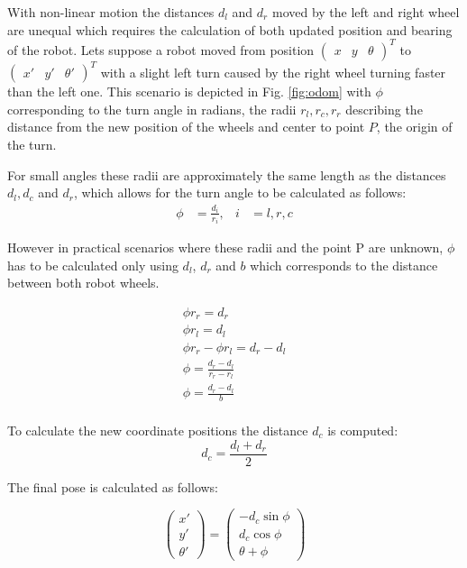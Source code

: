With non-linear motion the distances $d_{l}$ and $d_{r}$ moved by the left and right wheel are unequal which requires the calculation of both updated position and bearing of the robot. 
Lets suppose a robot moved from position $\begin{pmatrix} x & y & \theta \end{pmatrix}^{T}$ to $\begin{pmatrix} x' & y' & \theta' \end{pmatrix}^{T}$ with a slight left turn caused by the right wheel turning faster than the left one. 
This scenario is depicted in Fig. \ref{fig:odom} with $\phi$ corresponding to the turn angle in radians, the radii $r_{l}, r_{c}, r_{r}$ describing the distance from the new position of the wheels and center to point $P$, the origin of the turn. 

For small angles these radii are approximately the same length as the distances $d_{l}, d_{c}$ and $d_{r}$, which allows for the turn angle to be calculated as follows:
\begin{align*}
	\phi &= \frac{d_{i}}{r_{i}}, & i &= l, r, c  
\end{align*}

However in practical scenarios where these radii and the point P are unknown, $\phi$ has to be calculated only using $d_{l}$, $d_{r}$ and $b$ which corresponds to the distance between both robot wheels.

\begin{equation*}
	\begin{split}
		\phi r_{r} = d_{r} \\
		\phi r_{l} = d_{l} \\
		\phi r_{r} - \phi r_{l} = d_{r} - d_{l} \\
		\phi = \frac{d_{r} - d_{l}}{r_{r} - r_{l}} \\ 
		\phi = \frac{d_{r} - d_{l}}{b} \\
	\end{split}
\end{equation*}

To calculate the new coordinate positions the distance $d_{c}$ is computed:
\begin{equation*}
	d_{c} = \frac{d_{l} + d_{r}}{2}
\end{equation*}

The final pose is calculated as follows:

\begin{equation*}
	\begin{pmatrix}
		x' \\ 
		y' \\
		\theta'
	\end{pmatrix}
	= 
	\begin{pmatrix}
		-d_{c} \sin \phi \\
		d_{c} \cos \phi \\ 
		\theta + \phi
	\end{pmatrix}
\end{equation*}

